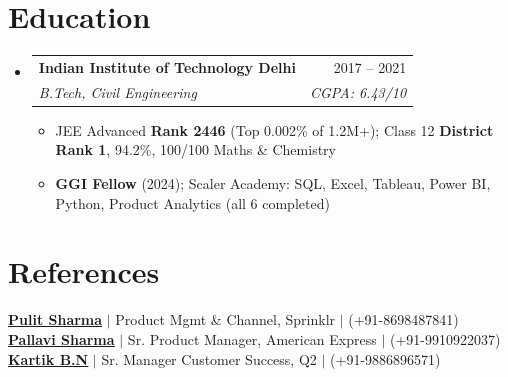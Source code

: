 \documentclass[a4paper,10pt]{article}
\makeatletter
\newcommand{\resumeItem}[1]{
  \item\small{#1\vspace{-2pt}}
}
\newcommand{\resumeSubheading}[4]{
  \vspace{-2pt}\item
  \begin{tabular*}{0.97\textwidth}[t]{l@{\extracolsep{\fill}}r}
    \textbf{#1} & #2 \\
    \textit{\small#3} & \textit{\small #4} \\
  \end{tabular*}\vspace{-7pt}
}
\newcommand{\resumeSubHeadingListStart}{\begin{itemize}[leftmargin=0.15in, label={}]}
\newcommand{\resumeSubHeadingListEnd}{\end{itemize}}
\newcommand{\resumeItemListStart}{\begin{itemize}\parfillskip=0pt}
\newcommand{\resumeItemListEnd}{\end{itemize}\vspace{-5pt}}
\makeatother
\begin{document}
\section{Education}
\resumeSubHeadingListStart
  \resumeSubheading
    {Indian Institute of Technology Delhi}{2017 -- 2021}
    {B.Tech, Civil Engineering}{CGPA: 6.43/10}
  \resumeItemListStart
    \resumeItem{JEE Advanced \textbf{Rank 2446} (Top 0.002\% of 1.2M+); Class 12 \textbf{District Rank 1}, 94.2\%, 100/100 Maths \& Chemistry}
    \resumeItem{\textbf{GGI Fellow} (2024); Scaler Academy: SQL, Excel, Tableau, Power BI, Python, Product Analytics (all 6 completed)}
  \resumeItemListEnd
\resumeSubHeadingListEnd

\vspace{-6pt}
\section{References}
\begin{itemize}[leftmargin=0.15in, label={}]
  \small{\item{
    \href{https://linkedin.com/in/pulit-sharma-36426349}{\textbf{\underline{Pulit Sharma}}} $|$ Product Mgmt \& Channel, Sprinklr $|$ (+91-8698487841) \\
    \href{https://linkedin.com/in/pallavi-sharma-54088159}{\textbf{\underline{Pallavi Sharma}}} $|$ Sr. Product Manager, American Express $|$ (+91-9910922037) \\
    \href{https://linkedin.com/in/kartik-bn-3770807b}{\textbf{\underline{Kartik B.N}}} $|$ Sr. Manager Customer Success, Q2 $|$ (+91-9886896571)
  }}
\end{itemize}
\end{document}
